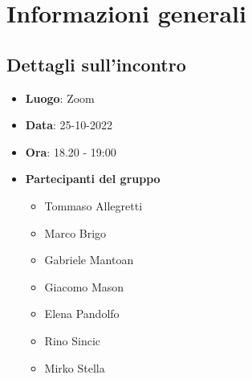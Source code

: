 \section{Informazioni generali}

\subsection{Dettagli sull'incontro}
\begin{itemize}
    \item \textbf{Luogo}: Zoom
    \item \textbf{Data}: 25-10-2022
    \item \textbf{Ora}: 18.20 - 19:00
    \item \textbf{Partecipanti del gruppo}
        \begin{itemize}
            \item Tommaso Allegretti
            \item Marco Brigo
            \item Gabriele Mantoan
            \item Giacomo Mason
            \item Elena Pandolfo
            \item Rino Sincic
            \item Mirko Stella
        \end{itemize}
\end{itemize}